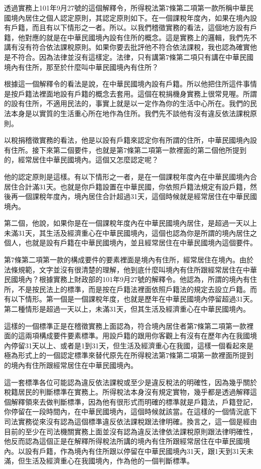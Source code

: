 \documentclass[oneside,sub3section]{ctexbook}
\begin{document}
透過實務上101年9月27號的這個解釋令，所得稅法第7條第二項第一款所稱中華民國境內居住之個人認定原則，其認定原則如下。在一個課稅年度內，如果在境內設有戶籍，而且有以下情形之一者。所以。以我們稽徵實務的看法，這個地方設有戶籍，他對應的就是在中華民國境內設有住所的概念。這是實務上的邏輯，我們先不講有沒有符合依法課稅原則。如果你要去批評他不符合依法課稅，我也認為確實他是不符合。因為法律並沒有這樣定。法律，只有講第7條第二項只有講在中華民國境內有住所，那至於什麼叫中華民國境內有住所？

根據這一個解釋令的看法是說，在中華民國境內設有戶籍。所以他把住所這件事情是按戶籍法裡面地設有戶籍的概念去套用。這個在稅捐機身實務上很常見喔。所謂的設有住所，不適用民法的，事實上就是以一定作為你的生活中心所在。我們的民法本身是以實質的生活重心所在地作為住所。我們先不談他有沒有違反依法課稅原則。

以稅捐稽徵實務的看法，他是以設有戶籍來認定你有所謂的住所，中華民國境內設有住所。接下來第二個要件，也就是第7條第二項第一款裡面的第二個他所提到的，經常居住中華民國境內。這個又怎麼認定呢？

他的認定原則是這樣。有以下情形之一者，是在一個課稅年度內在中華民國境內合居住合計滿31天。也就是你戶籍設置在中華民國，你依照戶籍法規定有設戶籍，然後再一個課稅年度內，境內居住合計超過31天，這個時候就是經常居住在中華民國境內。

第二個，他說，如果你是在一個課稅年度內在中華民國境內居住，是超過一天以上未滿31天，其生活及經濟重心在中華民國境內，這個也認為你是所謂的境內居住之個人，也就是設有戶籍在中華民國境內，並且經常居住在中華民國境內這個要件。

第7條第二項第一款的構成要件的要素裡面是境內有住所，經常居住在境內。由於法條規範，文字並沒有很清楚的理解，他到底什麼叫境內有住所跟經常居住在中華民國境內？根據實務上財政部的101年9月27號的解釋令。他認為，所謂的境內有住所，不是按民法上的標準，而是按在戶籍法裡面依照戶籍法的規定去設立戶籍。而有以下情形。第一個是一個課稅年度，也就是歷年在中華民國境內停留超過31天。第二種情形是超過一天以上，未滿31天，但其生活及經濟重心在中華民國境內。

這樣的一個標準正是在稽徵實務上面認為，符合境內居住者第7條第二項第一款裡面的這兩項構成要件要素標準。用設戶籍的跟用你客觀上有沒有在歷年內在我國境內停留31天以上、或者是1到31天，但生活及經濟重心在我國，這樣一個看起來是極為形式上的一個認定標準來替代原先在所得稅法第7條第二項第一款裡面所提到的境內有住所跟經常居住在中華民國境內。

這一套標準各位可能認為違反依法課稅或至少是違反稅法的明確性，因為幾乎關於稅籍居民的判斷標準在實務上。所得稅法本身沒有規定實物，幾乎都是透過解釋這個解釋領來去做判斷標準，因為他有很形式而明確的標準就是戶籍法，戶籍登記，你停留在一段時間內，在中華民國境內，這個時候就該當。在這樣的一個情況底下司法實務從來沒有認為這個標準違反依法課稅跟法律明確。換言之，這一個是經由目前的至少在司法機關實務上面並沒有認為違反法律依法課稅原則跟法律明確性，他反而認為這個正是在解釋所得稅法所講的境內有住所跟經常居住在中華民國境內。以設有戶籍，作為境內有住所跟以停留在中華民國境內31天，跟1天到31天未滿，但生活及經濟重心在我國境內，作為他的一個判斷標準。
\end{document}
